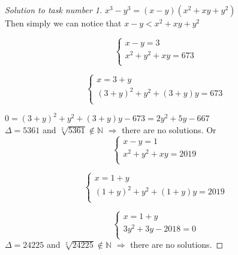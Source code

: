 \documentclass[12pt,a4paper]{article}
\begin{document}
\begin{proof}[Solution to task number 1]
$x^3-y^3=(x-y)(x^2+xy+y^2)$\\

 Then simply we can notice that $x-y<x^2+xy+y^2$

$$\left\{\begin{array}{rcl}
x-y=3\\
x^2+y^2+xy=673\\
\end{array} \right.$$

$$\left\{\begin{array}{rcl}
x=3+y\\
(3+y)^2+y^2+(3+y)y=673\\
\end{array} \right.$$

$0=(3+y)^2+y^2+(3+y)y-673=2y^2+5y-667$\\
 $\Delta =5361 $ and $ \sqrt[2]{5361} \notin \mathbb{N}$ $\Rightarrow$ there are no solutions.
Or 
$$\left\{\begin{array}{rcl}
x-y=1\\
x^2+y^2+xy=2019\\
\end{array} \right.$$ 

$$\left\{\begin{array}{rcl}
x=1+y\\
(1+y)^2+y^2+(1+y)y=2019\\
\end{array} \right.$$ 

$$\left\{\begin{array}{rcl}
x=1+y\\
3y^2+3y-2018=0\\
\end{array} \right.$$ 
$\Delta=24225$ and $ \sqrt[2]{24225} \notin \mathbb{N}$ $\Rightarrow$ there are no solutions.
 
\end{proof}
\vspace{1cm}
\end{document}
